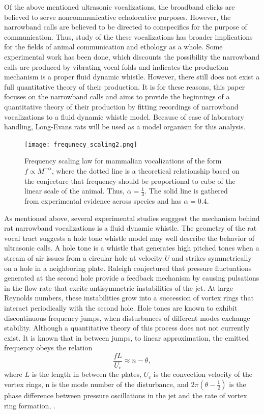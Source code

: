 \documentclass[twocolumn, prX]{revtex4}
\begin{document}
Of the above mentioned ultrasonic vocalizations, the broadband clicks are believed to serve noncommunicative echolocative purposes. However, the narrowband calls are believed to be directed to conspecifics for the purpose of communication. Thus, study of the these vocalizations has broader implications for the fields of animal communication and ethology as a whole. Some experimental work has been done, which discounts the possibility the narrowband calls are produced by vibrating vocal folds and indicates the production mechanism is a proper fluid dynamic whistle. However, there still does not exist a full quantitative theory of their production. It is for these reasons, this paper focuses on the narrowband calls and aims to provide the beginnings of a quantitative theory of their production by fitting recordings of narrowband vocalizations to a fluid dynamic whistle model. Because of ease of laboratory handling, Long-Evans rats will be used as a model organism for this analysis.
\begin{figure}
\begin{center}
\texttt{[image: frequnecy\_scaling2.png]}
\caption{\label{fig:frequency_scaling} Frequency scaling law for mammalian vocalizations of the form $f\propto M^{-\alpha}$, where the dotted line is a theoretical relationship based on the conjecture that frequency should be proportional to cube of the linear scale of the animal. Thus, $\alpha=\frac{1}{3}.$ The solid line is gathered from experimental evidence across species and has $\alpha=0.4$.}
\end{center}
\end{figure}

As mentioned above, several experimental studies sugggest the mechanism behind rat narrowband vocalizations is a fluid dynamic whistle. The geometry of the rat vocal tract suggests a hole tone whistle model may well describe the behavior of ultrasonic calls. A hole tone is a whistle that generates high pitched tones when a stream of air issues from a circular hole at velocity $U$ and strikes symmetrically on a hole in a neighboring plate. Raleigh conjectured that pressure fluctuations generated at the second hole provide a feedback mechanism by causing pulsations in the flow rate that excite antisymmetric instabilities of the jet. At large Reynolds numbers, these instabilities grow into a succession of vortex rings that interact periodically with the second hole. Hole tones are known to exhibit discontinuous frequency jumps, when disturbances of different modes exchange stability. Although a quantitative theory of this process does not not currently exist. It is known that in between jumps, to linear approximation, the emitted frequency obeys the relation 
\begin{equation}
\frac{fL}{U_{c}}\approx n-\theta,
\end{equation}
where $L$ is the length in between the plates, $U_{c}$ is the convection velocity of the vortex rings, n is the mode number of the disturbance, and $2\pi\left(\theta-\frac{1}{2}\right)$ is the phase difference between pressure oscillations in the jet and the rate of vortex ring formation, \cite{Howe1998}.
\end{document}

